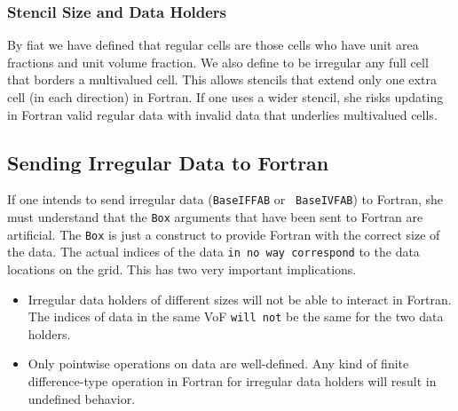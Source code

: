 \subsubsection{Stencil Size and Data Holders}

By fiat we have defined that regular cells are those cells who have
unit area fractions and unit volume fraction.  We also define to be
irregular any full cell that borders a multivalued cell.  This allows
stencils that extend only one extra cell (in each direction) in
Fortran.  If one uses a wider stencil, she risks updating in Fortran
valid regular data with invalid data that underlies multivalued cells.

\subsection{Sending Irregular Data to Fortran}

If one intends to send irregular data ({\tt BaseIFFAB} or {\tt
BaseIVFAB}) to Fortran, she must understand
that the {\tt Box} arguments that have been sent to Fortran are
artificial.  The {\tt Box} is just a construct to provide Fortran 
with the correct size of the data. The actual indices of the data
{\tt in no way correspond}  to the data locations on the grid.   This
has two  very important implications.
\begin{itemize}
\item Irregular data holders of different sizes will not be able to
interact in Fortran.  The indices of data in the same VoF {\tt will
not} be the same for the two data holders.

\item Only pointwise operations on data are well-defined.  Any kind of 
finite difference-type operation in Fortran for irregular data holders
will result in undefined behavior.        
\end{itemize}





